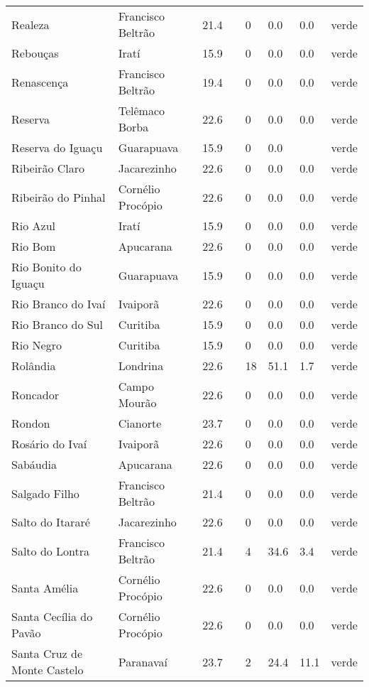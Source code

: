 \begin{longtable}{l|lllllll}
  Realeza & Francisco Beltrão & 21.4 &  & 0 & 0.0 & 0.0 & verde \\ 
  Rebouças & Iratí & 15.9 &  & 0 & 0.0 & 0.0 & verde \\ 
  Renascença & Francisco Beltrão & 19.4 &  & 0 & 0.0 & 0.0 & verde \\ 
  Reserva & Telêmaco Borba & 22.6 &  & 0 & 0.0 & 0.0 & verde \\ 
  Reserva do Iguaçu & Guarapuava & 15.9 &  & 0 & 0.0 &  & verde \\ 
  Ribeirão Claro & Jacarezinho & 22.6 &  & 0 & 0.0 & 0.0 & verde \\ 
  Ribeirão do Pinhal & Cornélio Procópio & 22.6 &  & 0 & 0.0 & 0.0 & verde \\ 
  Rio Azul & Iratí & 15.9 &  & 0 & 0.0 & 0.0 & verde \\ 
  Rio Bom & Apucarana & 22.6 &  & 0 & 0.0 & 0.0 & verde \\ 
  Rio Bonito do Iguaçu & Guarapuava & 15.9 &  & 0 & 0.0 & 0.0 & verde \\ 
  Rio Branco do Ivaí & Ivaiporã & 22.6 &  & 0 & 0.0 & 0.0 & verde \\ 
  Rio Branco do Sul & Curitiba & 15.9 &  & 0 & 0.0 & 0.0 & verde \\ 
  Rio Negro & Curitiba & 15.9 &  & 0 & 0.0 & 0.0 & verde \\ 
  Rolândia & Londrina & 22.6 &  & 18 & 51.1 & 1.7 & verde \\ 
  Roncador & Campo Mourão & 22.6 &  & 0 & 0.0 & 0.0 & verde \\ 
  Rondon & Cianorte & 23.7 &  & 0 & 0.0 & 0.0 & verde \\ 
  Rosário do Ivaí & Ivaiporã & 22.6 &  & 0 & 0.0 & 0.0 & verde \\ 
  Sabáudia & Apucarana & 22.6 &  & 0 & 0.0 & 0.0 & verde \\ 
  Salgado Filho & Francisco Beltrão & 21.4 &  & 0 & 0.0 & 0.0 & verde \\ 
  Salto do Itararé & Jacarezinho & 22.6 &  & 0 & 0.0 & 0.0 & verde \\ 
  Salto do Lontra & Francisco Beltrão & 21.4 &  & 4 & 34.6 & 3.4 & verde \\ 
  Santa Amélia & Cornélio Procópio & 22.6 &  & 0 & 0.0 & 0.0 & verde \\ 
  Santa Cecília do Pavão & Cornélio Procópio & 22.6 &  & 0 & 0.0 & 0.0 & verde \\ 
  Santa Cruz de Monte Castelo & Paranavaí & 23.7 &  & 2 & 24.4 & 11.1 & verde \\ 

\end{longtable}
